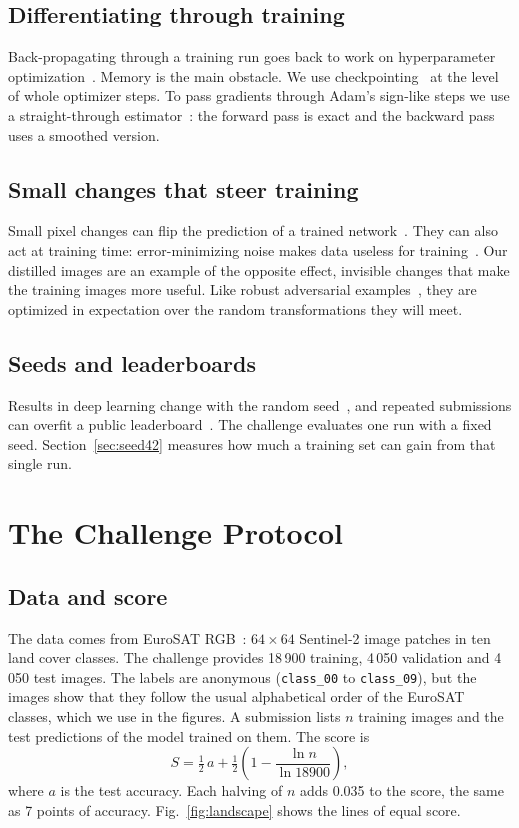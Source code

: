 \documentclass[journal]{IEEEtran}
\begin{document}
\subsection{Differentiating through training}
Back-propagating through a training run goes back to work on hyperparameter
optimization~\cite{maclaurin2015reversible}. Memory is the main obstacle. We use checkpointing~\cite{chen2016checkpoint}
at the level of whole optimizer steps. To pass gradients through Adam's sign-like steps we use a straight-through
estimator~\cite{bengio2013ste}: the forward pass is exact and the backward pass uses a smoothed version.

\subsection{Small changes that steer training}
Small pixel changes can flip the prediction of a trained network~\cite{szegedy2014intriguing,goodfellow2015explaining}.
They can also act at training time: error-minimizing noise makes data useless for training~\cite{huang2021unlearnable}.
Our distilled images are an example of the opposite effect, invisible changes that make the training images more
useful. Like robust adversarial examples~\cite{athalye2018eot}, they are optimized in expectation over the random
transformations they will meet.

\subsection{Seeds and leaderboards}
Results in deep learning change with the random seed~\cite{bouthillier2021variance,picard2021seed}, and repeated
submissions can overfit a public leaderboard~\cite{blum2015ladder}. The challenge evaluates one run with a fixed seed.
Section~\ref{sec:seed42} measures how much a training set can gain from that single run.

\section{The Challenge Protocol}
\label{sec:protocol}

\subsection{Data and score}
The data comes from EuroSAT RGB~\cite{helber2019eurosat}: $64\times64$ Sentinel-2 image patches in ten land cover
classes. The challenge provides 18\,900 training, 4\,050 validation and 4\,050 test images. The labels are anonymous
(\texttt{class\_00} to \texttt{class\_09}), but the images show that they follow the usual alphabetical order of
the EuroSAT classes, which we use in the figures. A submission lists $n$ training images and the test predictions of
the model trained on them. The score is
\begin{equation}
S = \tfrac{1}{2}\,a + \tfrac{1}{2}\left(1 - \frac{\ln n}{\ln 18900}\right),
\label{eq:score}
\end{equation}
where $a$ is the test accuracy. Each halving of $n$ adds 0.035 to the score, the same as 7 points of accuracy.
Fig.~\ref{fig:landscape} shows the lines of equal score.
\end{document}

